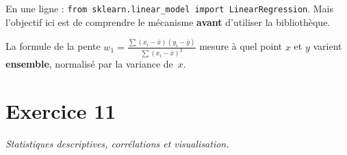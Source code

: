 \begin{intuitionbox}
    En une ligne : \texttt{from sklearn.linear\_model import LinearRegression}.
    Mais l'objectif ici est de comprendre le m\'{e}canisme \textbf{avant} d'utiliser la biblioth\`{e}que.
\end{intuitionbox}

\begin{retenirbox}
    La formule de la pente $w_1 = \frac{\sum(x_i - \bar{x})(y_i - \bar{y})}{\sum(x_i - \bar{x})^2}$
    mesure \`{a} quel point $x$ et $y$ varient \textbf{ensemble}, normalis\'{e} par la variance de~$x$.
\end{retenirbox}

\section*{Exercice 11 \hfill \exoavance}
\textit{Statistiques descriptives, corr\'{e}lations et visualisation.}

\separateur

